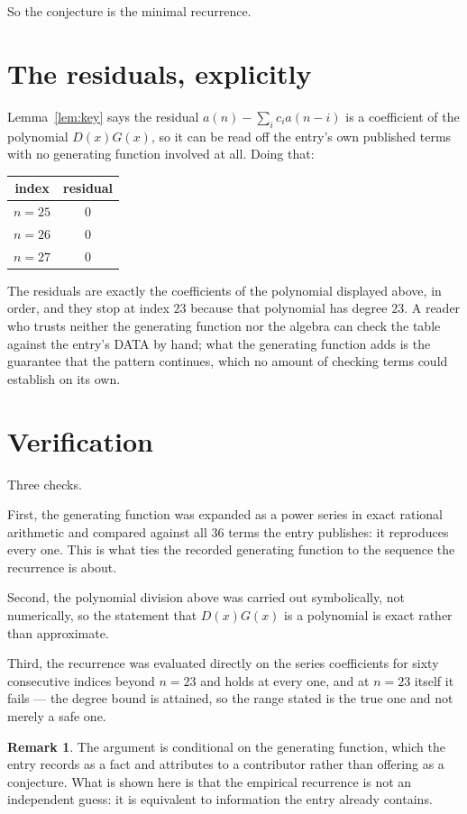 \documentclass[11pt,a4paper]{article}
\theoremstyle{plain}
\theoremstyle{definition}
\newtheorem{remark}[theorem]{Remark}
\begin{document}
So the conjecture is the minimal recurrence.

\section{The residuals, explicitly}

Lemma~\ref{lem:key} says the residual $a(n)-\sum_ic_ia(n-i)$ is a coefficient of the
polynomial $D(x)G(x)$, so it can be read off the entry's own published terms with no
generating function involved at all. Doing that:
\begin{center}
\begin{tabular}{cc}
index & residual \\ \hline
$n=25$ & $0$ \\
$n=26$ & $0$ \\
$n=27$ & $0$
\end{tabular}
\end{center}
The residuals are exactly the coefficients of the polynomial displayed above, in order, and
they stop at index $23$ because that polynomial has degree $23$. A reader who trusts
neither the generating function nor the algebra can check the table against the entry's DATA
by hand; what the generating function adds is the guarantee that the pattern continues, which
no amount of checking terms could establish on its own.

\section{Verification}

Three checks.

First, the generating function was expanded as a power series in exact rational arithmetic and
compared against all $36$ terms the entry publishes: it reproduces every one. This is
what ties the recorded generating function to the sequence the recurrence is about.

Second, the polynomial division above was carried out symbolically, not numerically, so the
statement that $D(x)G(x)$ is a polynomial is exact rather than approximate.

Third, the recurrence was evaluated directly on the series coefficients for sixty consecutive
indices beyond $n=23$ and holds at every one, and at $n=23$ itself it fails --- the
degree bound is attained, so the range stated is the true one and not merely a safe one.

\begin{remark}
The argument is conditional on the generating function, which the entry records as a fact and
attributes to a contributor rather than offering as a conjecture. What is shown here is that
the empirical recurrence is not an independent guess: it is equivalent to information the
entry already contains.
\end{remark}
\end{document}
